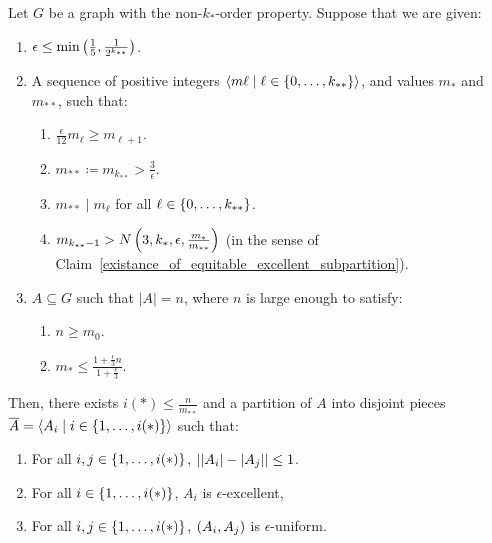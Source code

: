     \lemma[Corollary 5.15]\label{resume_of_all_conditions_for_excellent_partitions}
        Let $G$ be a graph with the non-$k_{*}$-order property.
        Suppose that we are given:
        \begin{enumerate}
            \item $\epsilon \leq \min \left( \frac{1}{5}, \frac{1}{2^{k_{**}}} \right)$.
            \item A sequence of positive integers $\left< m\ell \mid \ell \in \left\{ 0, \dots, k_{**} \right\} \right>$, and values $m_*$
                and $m_{**}$, such that:
                \begin{enumerate}[label=(\alph*), ref=2.\alph*]
                    \item \label{itm:5.15.a} $\frac{\epsilon}{12} m_\ell \geq m_{\ell + 1}$.
                    \item \label{itm:5.15.b} $m_{**} \coloneq m_{k_{**}} > \frac{3}{\epsilon}$.
                    \item \label{itm:5.15.c} $m_{**} \mid m_\ell$ for all $\ell \in \left\{ 0, \dots, k_{**} \right\}$.
                    \item \label{itm:5.15.d} $m_{k_{**}-1} > N\left( 3, k_*, \epsilon, \frac{m_*}{m_{**}} \right)$ (in the sense
                        of Claim~\ref{existance_of_equitable_excellent_subpartition}).
            \end{enumerate}
            \item $A \subseteq G$ such that $|A| = n$, where $n$ is large enough to satisfy:
            \begin{enumerate}[label=(\alph*'), ref=3.\alph*]
                \item \label{itm:5.15.a'} $n \geq m_0$. 
                \item \label{itm:5.15.b'} $m_* \leq \frac{1 + \frac{\epsilon}{3}n}{1 + \frac{\epsilon}{3}}$.
            \end{enumerate}
        \end{enumerate}
        Then, there exists $i(*) \leq \frac{n}{m_{**}}$ and a partition of $A$ into disjoint pieces
        $\overline{A} = \left< A_i \mid i \in \left\{ 1, \dots, i(*) \right\} \right>$ such that:
        \begin{enumerate}[label=(\roman*), ref=\roman*]
            \item \label{itm:5.15.i} For all $i, j \in \left\{ 1, \dots, i(*) \right\}$, $\left| \left| A_i \right|- \left| A_j \right| \right| \leq 1$.
            \item \label{itm:5.15.ii} For all $i \in \left\{ 1, \dots, i(*) \right\}$, $A_i$ is $\epsilon$-excellent,
            \item \label{itm:5.15.iii} For all $i, j \in \left\{ 1, \dots, i(*) \right\}$, $\left( A_i, A_j \right)$ is $\epsilon$-uniform.
        \end{enumerate}

